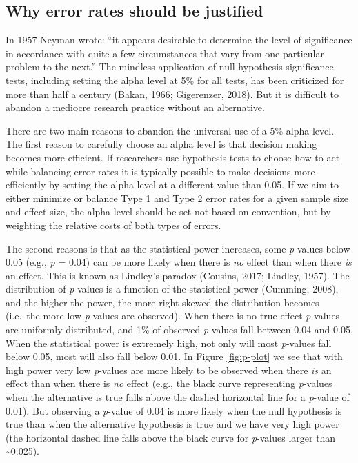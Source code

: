 \documentclass[
  english,
  ,man,floatsintext]{apa6}
\begin{document}
\hypertarget{why-error-rates-should-be-justified}{%
\subsection{Why error rates should be justified}\label{why-error-rates-should-be-justified}}

In 1957 Neyman wrote: ``it appears desirable to determine the level of significance in accordance with quite a few circumstances that vary from one particular problem to the next.'' The mindless application of null hypothesis significance tests, including setting the alpha level at 5\% for all tests, has been criticized for more than half a century (Bakan, 1966; Gigerenzer, 2018). But it is difficult to abandon a mediocre research practice without an alternative.

There are two main reasons to abandon the universal use of a 5\% alpha level. The first reason to carefully choose an alpha level is that decision making becomes more efficient. If researchers use hypothesis tests to choose how to act while balancing error rates it is typically possible to make decisions more efficiently by setting the alpha level at a different value than 0.05. If we aim to either minimize or balance Type 1 and Type 2 error rates for a given sample size and effect size, the alpha level should be set not based on convention, but by weighting the relative costs of both types of errors.

The second reasons is that as the statistical power increases, some \emph{p}-values below 0.05 (e.g., \emph{p} = 0.04) can be more likely when there is \emph{no} effect than when there \emph{is} an effect. This is known as Lindley's paradox (Cousins, 2017; Lindley, 1957). The distribution of \emph{p}-values is a function of the statistical power (Cumming, 2008), and the higher the power, the more right-skewed the distribution becomes (i.e.~the more low \emph{p}-values are observed). When there is no true effect \emph{p}-values are uniformly distributed, and 1\% of observed \emph{p}-values fall between 0.04 and 0.05. When the statistical power is extremely high, not only will most \emph{p}-values fall below 0.05, most will also fall below 0.01. In Figure \ref{fig:p-plot} we see that with high power very low \emph{p}-values are more likely to be observed when there \emph{is} an effect than when there is \emph{no} effect (e.g., the black curve representing \emph{p}-values when the alternative is true falls above the dashed horizontal line for a \emph{p}-value of 0.01). But observing a \emph{p}-value of 0.04 is more likely when the null hypothesis is true than when the alternative hypothesis is true and we have very high power (the horizontal dashed line falls above the black curve for \emph{p}-values larger than \textasciitilde0.025).
\end{document}
